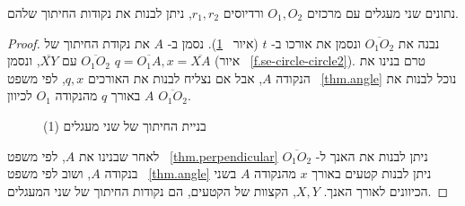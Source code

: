 \begin{theorem}\label{thm.two-circles}
נתונים שני מעגלים עם מרכזים
$O_1,O_2$
ורדיוסים
$r_1,r_2$,
ניתן לבנות את נקודות החיתוך שלהם.
\end{theorem}
\begin{proof}
נבנה את
$\overline{O_1O_2}$
ונסמן את אורכו ב-%
$t$
(איור%
~\ref{f.se-circle-circle1}).
נסמן ב-%
$A$
את נקודת החיתוך של
$\overline{O_1O_2}$
עם
$\overline{XY}$,
ונסמן
$q=\overline{O_1A},x=\overline{XA}$
(איור%
~\ref{f.se-circle-circle2}).
טרם בנינו את הנקודה
$A$,
אבל אם נצליח לבנות את האורכים
$q,x$,
לפי משפט~%
\ref{thm.angle}
נוכל לבנות את 
$A$
באורך
$q$
מהנקודה
$O_1$
לכיוון
$\overline{O_1O_2}$.
\begin{figure}[tb]
\begin{center}
\end{center}
\caption{בניית החיתוך של שני מעגלים (1)}\label{f.se-circle-circle1}
\end{figure}
לאחר שבנינו את
$A$,
לפי משפט~%
\ref{thm.perpendicular}
ניתן לבנות את האנך ל-%
$\overline{O_1O_2}$
בנקודה
$A$,
ושוב לפי משפט~%
\ref{thm.angle}
ניתן לבנות קטעים באורך
$x$
מהנקודה
$A$
בשני הכיוונים לאורך האנך.
$X,Y$,
הקצוות של הקטעים, הם נקודות החיתוך של שני המעגלים.


\end{proof}
